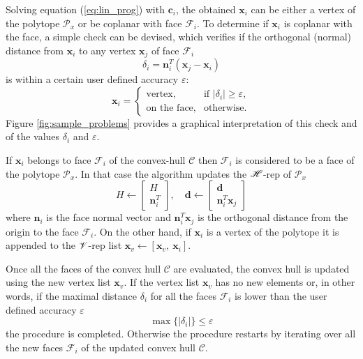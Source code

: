 
Solving equation (\ref{eq:lin_prog}) with $\bm{c}_i$, the obtained $\bm{x}_i$ can be either a vertex of the polytope $\mathcal{P}_x$ or be coplanar with face $\mathcal{F}_i$. To determine if  $\bm{x}_i$ is coplanar with the face, a simple check can be devised, which verifies if the orthogonal (normal) distance from $\bm{x}_i$ to any vertex $\bm{x}_{j}$ of face $\mathcal{F}_i$
\begin{equation}
    \delta_i = \bm{n}_i^T(\bm{x}_{j} - \bm{x}_i)
\label{eq:normal_distance}
\end{equation}
is within a certain user defined accuracy $\varepsilon$:
\begin{equation}
    \bm{x}_i = \begin{cases}
   \text{vertex}, & \text{if }  |\delta_i| \geq \varepsilon, \\
    \text{on the face}, & \text{otherwise}.
\end{cases} 
\label{eq:normal_coplanar_test}
\end{equation}
Figure \ref{fig:sample_problems} provides a graphical interpretation of this check and of the values $\delta_i$ and $\varepsilon$.

If $\bm{x}_i$ belongs to face $\mathcal{F}_i$ of the convex-hull $\mathcal{C}$ then  $\mathcal{F}_i$ is considered to be a face of the polytope $\mathcal{P}_x$. In that case the algorithm updates the $\mathscr{H}$-rep of $\mathcal{P}_x$ 
\begin{equation}
    H \leftarrow \begin{bmatrix} H \\ \bm{n}_i^T\end{bmatrix}, \quad \bm{d} \leftarrow \begin{bmatrix}  \bm{d} \\ \bm{n}^T_i \bm{x}_{j} \end{bmatrix}
\label{eq:h_rep}
\end{equation}
where $\bm{n}_i$ is the face normal vector and $\bm{n}_i^T \bm{x}_{j}$ is the orthogonal distance from the origin to the face $\mathcal{F}_i$. On the other hand, if $\bm{x}_i$ is a vertex of the polytope it is appended to the $\mathscr{V}$-rep list $\bm{x}_v \leftarrow [\bm{x}_v, ~\bm{x}_i]$.

Once all the faces of the convex hull $\mathcal{C}$ are evaluated, the convex hull is updated using the new vertex list $\bm{x}_v$.
If the vertex list $\bm{x}_v$ has no new elements or, in other words, if the maximal distance $\delta_i$ for all the faces $\mathcal{F}_i$ is lower than the user defined accuracy $\varepsilon$  
\begin{equation}
    \max\{|\delta_{i}|\} \leq \varepsilon
\end{equation}
the procedure is completed. Otherwise the procedure restarts by iterating over all the new faces $\mathcal{F}_i$ of the updated convex hull $\mathcal{C}$. 

